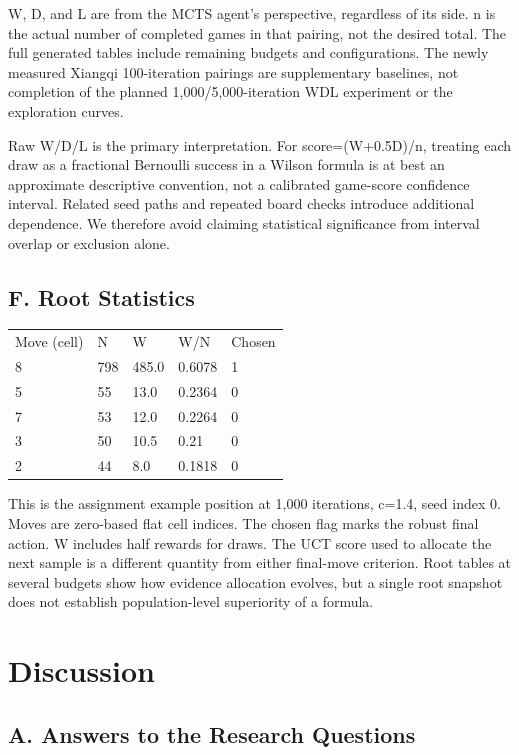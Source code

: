 \documentclass[conference]{IEEEtran}
\begin{document}
W, D, and L are from the MCTS agent's perspective, regardless of its side. n is the actual number of completed games in that pairing, not the desired total. The full generated tables include remaining budgets and configurations. The newly measured Xiangqi 100-iteration pairings are supplementary baselines, not completion of the planned 1,000/5,000-iteration WDL experiment or the exploration curves.


Raw W/D/L is the primary interpretation. For score=(W+0.5D)/n, treating each draw as a fractional Bernoulli success in a Wilson formula is at best an approximate descriptive convention, not a calibrated game-score confidence interval. Related seed paths and repeated board checks introduce additional dependence. We therefore avoid claiming statistical significance from interval overlap or exclusion alone.


\subsection{F. Root Statistics}

\begin{center}\scriptsize\begin{tabular}{lllll}\hline
Move (cell) & N & W & W/N & Chosen \\
8 & 798 & 485.0 & 0.6078 & 1 \\
5 & 55 & 13.0 & 0.2364 & 0 \\
7 & 53 & 12.0 & 0.2264 & 0 \\
3 & 50 & 10.5 & 0.21 & 0 \\
2 & 44 & 8.0 & 0.1818 & 0 \\
\hline\end{tabular}\end{center}

This is the assignment example position at 1,000 iterations, c=1.4, seed index 0. Moves are zero-based flat cell indices. The chosen flag marks the robust final action. W includes half rewards for draws. The UCT score used to allocate the next sample is a different quantity from either final-move criterion. Root tables at several budgets show how evidence allocation evolves, but a single root snapshot does not establish population-level superiority of a formula.


\section{Discussion}

\subsection{A. Answers to the Research Questions}
\end{document}
